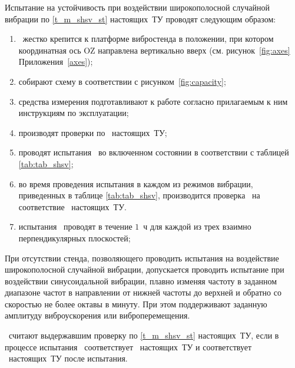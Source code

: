 Испытание на устойчивость при воздействии широкополосной случайной вибрации по \ref{t_m_shsv_st} настоящих~ТУ проводят следующим образом: 
%
\begin{enumerate}
	\item \dut \ жестко крепится к платформе вибростенда в положении, при котором координатная ось OZ направлена вертикально вверх (см. рисунок~\ref{fig:axes} Приложения~\ref{axes});
	\item собирают схему в соответствии с рисунком~\ref{fig:capacity};
	\item средства измерения подготавливают к работе согласно прилагаемым к ним инструкциям по эксплуатации;
	\item производят проверки по \treb \ настоящих~ТУ;
	\item проводят испытания \dut \ во включенном состоянии в соответствии с таблицей \ref{tab:tab_shsv};
	\item во время проведения испытания в каждом из режимов вибрации, приведенных в таблице 	\ref{tab:tab_shsv}, производится проверка \dut \ на соответствие \treb \ настоящих~ТУ.
	\item испытания \dut \ проводят в течение $1$~ч для каждой из трех взаимно перпендикулярных плоскостей;
\end{enumerate}

При отсутствии стенда, позволяющего проводить испытания на воздействие широкополосной случайной вибрации, допускается проводить испытание при воздействии синусоидальной  вибрации, плавно изменяя частоту в заданном диапазоне частот в направлении от нижней частоты до верхней и обратно со скоростью не более октавы в минуту. При этом поддерживают заданную амплитуду виброускорения или виброперемещения.

\dut \ считают выдержавшим проверку по \ref{t_m_shsv_st} настоящих~ТУ, если в процессе испытания \dut \ соответствует \treb \ настоящих~ТУ и соответствует \trebafter \ настоящих~ТУ после испытания.